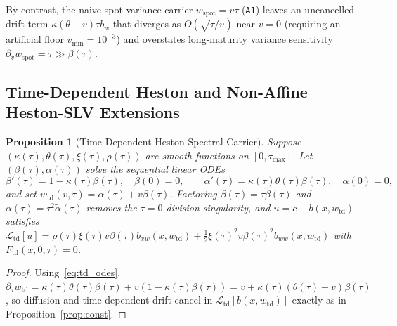 \documentclass[preprint,12pt]{elsarticle}
\newtheorem{proposition}{Proposition}
\begin{document}
By contrast, the naive spot-variance carrier $w_{\mathrm{spot}} = v\tau$ (\texttt{A1}) leaves an uncancelled drift term $\kappa(\theta - v)\tau b_w$ that diverges as $O(\sqrt{\tau/v})$ near $v = 0$ (requiring an artificial floor $v_{\min} = 10^{-3}$) and overstates long-maturity variance sensitivity $\partial_v w_{\mathrm{spot}} = \tau \gg \beta(\tau)$.

\subsection{Time-Dependent Heston and Non-Affine Heston-SLV Extensions}

\begin{proposition}[Time-Dependent Heston Spectral Carrier]
\label{prop:td}
Suppose $(\kappa(\tau), \theta(\tau), \xi(\tau), \rho(\tau))$ are smooth functions on $[0, \tau_{\max}]$. Let $(\beta(\tau), \alpha(\tau))$ solve the sequential linear ODEs
\begin{equation}
  \beta'(\tau) = 1 - \kappa(\tau)\beta(\tau), \quad \beta(0) = 0, \qquad \alpha'(\tau) = \kappa(\tau)\theta(\tau)\beta(\tau), \quad \alpha(0) = 0,
  \label{eq:td_odes}
\end{equation}
and set $w_{\mathrm{td}}(v, \tau) = \alpha(\tau) + v\beta(\tau)$. Factoring $\beta(\tau) = \tau\tilde{\beta}(\tau)$ and $\alpha(\tau) = \tau^2\tilde{\alpha}(\tau)$ removes the $\tau = 0$ division singularity, and $u = c - b(x, w_{\mathrm{td}})$ satisfies $\mathcal{L}_{\mathrm{td}}[u] = \rho(\tau)\xi(\tau)v\beta(\tau)b_{xw}(x, w_{\mathrm{td}}) + \frac{1}{2}\xi(\tau)^2 v\beta(\tau)^2 b_{ww}(x, w_{\mathrm{td}})$ with $F_{\mathrm{td}}(x, 0, \tau) = 0$.
\end{proposition}
\begin{proof}
Using~\eqref{eq:td_odes}, $\partial_\tau w_{\mathrm{td}} = \kappa(\tau)\theta(\tau)\beta(\tau) + v(1 - \kappa(\tau)\beta(\tau)) = v + \kappa(\tau)(\theta(\tau) - v)\beta(\tau)$, so diffusion and time-dependent drift cancel in $\mathcal{L}_{\mathrm{td}}[b(x, w_{\mathrm{td}})]$ exactly as in Proposition~\ref{prop:const}.
\end{proof}
\end{document}
